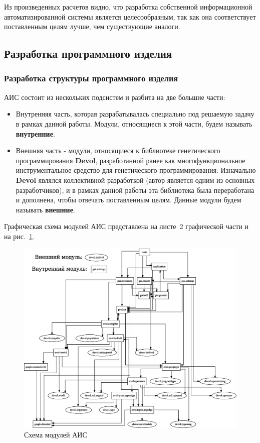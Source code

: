 \documentclass[russian,utf8,emptystyle]{eskdtext}
\begin{document}
\begin{spacing}{1.5}
Из произведенных расчетов видно, что разработка собственной информационной автоматизированной системы является целесообразным, так как она соответствует поставленным целям лучше, чем существующие аналоги.

\newpage
\subsection{Разработка программного изделия}
\subsubsection{Разработка структуры программного изделия}
АИС состоит из нескольких подсистем и разбита на две большие части:
\begin{itemize}
\item Внутренняя часть, которая разрабатывалась специально под решаемую задачу в рамках данной работы. Модули, относящиеся к этой части, будем называть \textbf{внутренние}. 
\item Внешняя часть - модули, относящиеся к библиотеке генетического программирования \textbf{Devol}, разработанной ранее как многофункциональное инструментальное средство для генетического программирования. Изначально \textbf{Devol} являлся коллективной разработкой (автор является одним из основных разработчиков), и в рамках данной работы эта библиотека была переработана и дополнена, чтобы отвечать поставленным целям. Данные модули будем называть \textbf{внешние}.
\end{itemize}

Графическая схема модулей АИС представлена на листе~2 графической части и на рис.~\ref{fig:modulesScheme}.

\begin{figure}[h!]
\centering
\includegraphics[width=1.0\textwidth]{modules}
\caption{Схема модулей АИС}
\label{fig:modulesScheme}
\end{figure}


\end{spacing}
\end{document}
